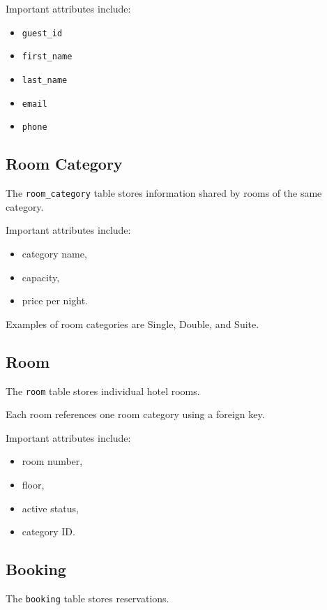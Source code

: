 \documentclass[12pt,a4paper]{article}
\begin{document}
Important attributes include:

\begin{itemize}
    \item \texttt{guest\_id}
    \item \texttt{first\_name}
    \item \texttt{last\_name}
    \item \texttt{email}
    \item \texttt{phone}
\end{itemize}

\subsection{Room Category}

The \texttt{room\_category} table stores information shared by rooms of
the same category.

Important attributes include:

\begin{itemize}
    \item category name,
    \item capacity,
    \item price per night.
\end{itemize}

Examples of room categories are Single, Double, and Suite.

\subsection{Room}

The \texttt{room} table stores individual hotel rooms.

Each room references one room category using a foreign key.

Important attributes include:

\begin{itemize}
    \item room number,
    \item floor,
    \item active status,
    \item category ID.
\end{itemize}

\subsection{Booking}

The \texttt{booking} table stores reservations.
\end{document}
